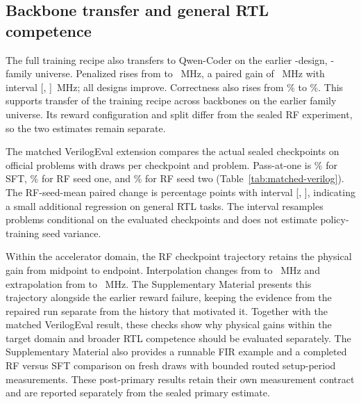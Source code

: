 \subsection{Backbone transfer and general RTL competence}

The full training recipe also transfers to Qwen-Coder on the earlier
-design, -family universe.
Penalized \fmax{} rises from  to
~MHz, a paired gain of
~MHz with interval
[, ]~MHz; all
 designs improve.  Correctness also rises from
\% to
\%.  This supports transfer of the training recipe across backbones on the
earlier family universe. Its reward configuration and split differ from the
sealed RF experiment, so the two estimates remain separate.


The matched VerilogEval extension compares the actual sealed checkpoints on
 official problems with
 draws per checkpoint and problem.  Pass-at-one
is \% for SFT,
\% for RF seed one, and
\% for RF seed two
(Table~\ref{tab:matched-verilog}).  The RF-seed-mean paired change is
 percentage points with interval
[, ], indicating a
small additional regression on general RTL tasks.
The interval resamples problems conditional on the evaluated checkpoints and
does not estimate policy-training seed variance.

Within the accelerator domain, the RF checkpoint trajectory retains the
physical gain from midpoint to endpoint. Interpolation changes from
 to
~MHz and extrapolation from
 to
~MHz. The Supplementary Material presents this
trajectory alongside the earlier reward failure, keeping the evidence from
the repaired run separate from the history that motivated it. Together with
the matched VerilogEval result, these checks show why physical gains within
the target domain and broader RTL competence should be evaluated separately.
The Supplementary Material also provides a runnable FIR example and a completed
RF versus SFT comparison on fresh draws with bounded routed setup-period
measurements. These post-primary results retain their own measurement contract
and are reported separately from the sealed primary estimate.
